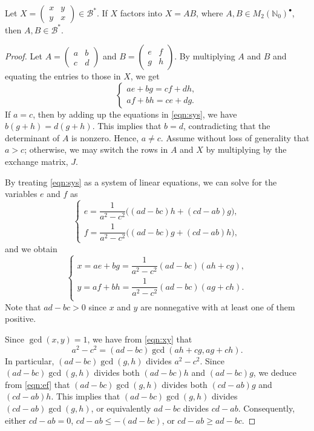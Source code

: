 \documentclass[10pt,a4paper]{amsart}
\newcommand{\Bstar}{\mathcal{B}^*}
\newcommand{\mtwo}{M_2(\mathbb{N}_0)^\bullet}
\newcommand{\pmx}[4]{\begin{pmatrix} #1 & #2 \\ #3 & #4 \end{pmatrix}}
\begin{document}
\begin{theorem}\label{thm:bisym factors} Let $X=\pmx{x}{y}{y}{x}\in \Bstar$. If $X$ factors into $X=AB$, where $A,B \in \mtwo$, then $A,B \in \Bstar$. 
\end{theorem}

\begin{proof}
Let $A=\pmx{a}{b}{c}{d}$ and $B=\pmx{e}{f}{g}{h}$. By multiplying $A$ and $B$ and equating the entries to those in $X$, we get
\begin{equation}\label{eqn:sys}
\begin{cases}
ae+bg=cf+dh,\\
af+bh=ce+dg.
\end{cases}
\end{equation}
If $a=c$, then by adding up the equations in \eqref{eqn:sys}, we have $b(g+h)=d(g+h)$. This implies that $b=d$, contradicting that the determinant of $A$ is nonzero. Hence, $a\neq c$. Assume without loss of generality that $a>c$; otherwise, we may switch the rows in $A$ and $X$ by multiplying by the exchange matrix, $J$. 

By treating \eqref{eqn:sys} as a system of linear equations, we can solve for the variables $e$ and $f$ as
\begin{equation}\label{eqn:ef}
\begin{cases}
e=\dfrac{1}{a^2-c^2}\big((ad-bc)h+(cd-ab)g\big),\\
f=\dfrac{1}{a^2-c^2}\big((ad-bc)g+(cd-ab)h\big),
\end{cases}
\end{equation}
and we obtain
\begin{equation}\label{eqn:xy}
\begin{cases}
x=ae+bg=\dfrac{1}{a^2-c^2}(ad-bc)(ah+cg),\\
y=af+bh=\dfrac{1}{a^2-c^2}(ad-bc)(ag+ch).\\
\end{cases}
\end{equation}
Note that $ad-bc>0$ since $x$ and $y$ are nonnegative with at least one of them positive.

Since $\gcd(x,y)=1$, we have from \eqref{eqn:xy} that
\begin{equation}\label{eqn:a^2-c^2first}
a^2-c^2=(ad-bc)\gcd(ah+cg,ag+ch).
\end{equation}
In particular, $(ad-bc)\gcd(g,h)$ divides $a^2-c^2$. Since $(ad-bc)\gcd(g,h)$ divides both $(ad-bc)h$ and $(ad-bc)g$, we deduce from \eqref{eqn:ef} that $(ad-bc)\gcd(g,h)$ divides both $(cd-ab)g$ and $(cd-ab)h$. This implies that $(ad-bc)\gcd(g,h)$ divides $(cd-ab)\gcd(g,h)$, or equivalently $ad-bc$ divides $cd-ab$. Consequently, either $cd-ab=0$, $cd-ab\leq-(ad-bc)$, or $cd-ab\geq ad-bc$.


\end{proof}
\end{document}
